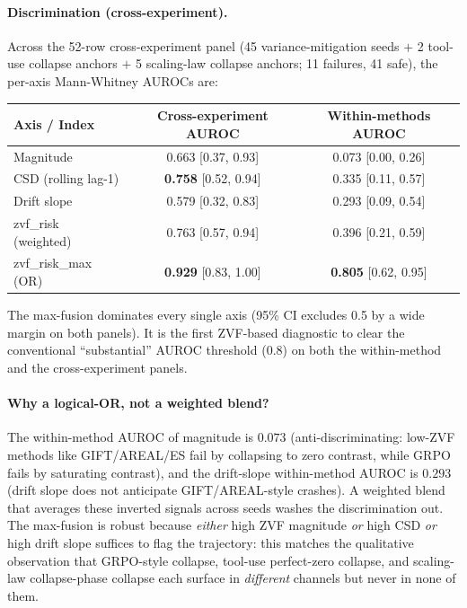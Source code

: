 \paragraph{Discrimination (cross-experiment).} Across the 52-row
cross-experiment panel (45 variance-mitigation seeds $+$ 2 tool-use
collapse anchors $+$ 5 scaling-law collapse anchors; 11 failures,
41 safe), the per-axis Mann-Whitney AUROCs are:
\begin{center}
\small
\begin{tabular}{lcc}
\hline
Axis / Index & Cross-experiment AUROC & Within-methods AUROC \\
\hline
Magnitude              & 0.663 [0.37, 0.93] & 0.073 [0.00, 0.26] \\
CSD (rolling lag-1)    & \textbf{0.758} [0.52, 0.94] & 0.335 [0.11, 0.57] \\
Drift slope            & 0.579 [0.32, 0.83] & 0.293 [0.09, 0.54] \\
zvf\_risk (weighted)   & 0.763 [0.57, 0.94] & 0.396 [0.21, 0.59] \\
zvf\_risk\_max (OR)    & \textbf{0.929} [0.83, 1.00] & \textbf{0.805} [0.62, 0.95] \\
\hline
\end{tabular}
\end{center}
The max-fusion dominates every single axis (95\% CI excludes 0.5 by a
wide margin on both panels). It is the first ZVF-based diagnostic to
clear the conventional ``substantial'' AUROC threshold ($0.8$) on both
the within-method and the cross-experiment panels.

\paragraph{Why a logical-OR, not a weighted blend?} The within-method
AUROC of magnitude is $0.073$ (anti-discriminating: low-ZVF methods
like GIFT/AREAL/ES fail by collapsing to zero contrast, while GRPO
fails by saturating contrast), and the drift-slope within-method AUROC
is $0.293$ (drift slope does not anticipate GIFT/AREAL-style
crashes). A weighted blend that averages these inverted signals across
seeds washes the discrimination out. The max-fusion is robust because
\emph{either} high ZVF magnitude \emph{or} high CSD \emph{or} high
drift slope suffices to flag the trajectory: this matches the
qualitative observation that GRPO-style collapse, tool-use perfect-zero
collapse, and scaling-law collapse-phase collapse each surface in
\emph{different} channels but never in none of them.

